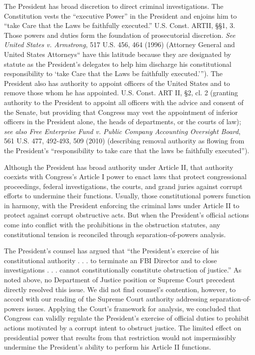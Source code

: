 The President has broad discretion to direct criminal investigations.
The Constitution vests the “executive Power” in the President and enjoins him to “take Care that the Laws be faithfully executed.” U.S. Const. ARTII, \S\S 1, 3.
Those powers and duties form the foundation of prosecutorial discretion.
\textit{See United States v. Armstrong}, 517 U.S. 456, 464 (1996) (Attorney General and United States Attorneys“ have this latitude because they are designated by statute as the President’s delegates to help him discharge his constitutional responsibility to ‘take Care that the Laws be faithfully executed.’”).
The President also has authority to appoint officers of the United States and to remove those whom he has appointed.
U.S. Const. ART II, \S 2, cl. 2 (granting authority to the President to appoint all officers with the advice and consent of the Senate, but providing that Congress may vest the appointment of inferior officers in the President alone, the heads of departments, or the courts of law);
\textit{see also Free Enterprise Fund v. Public Company Accounting Oversight Board}, 561 U.S. 477, 492-493, 509 (2010) (describing removal authority as flowing from the President’s “responsibility to take care that the laws be faithfully executed”).

Although the President has broad authority under Article II, that authority coexists with Congress’s Article I power to enact laws that protect congressional proceedings, federal investigations, the courts, and grand juries against corrupt efforts to undermine their functions.
Usually, those constitutional powers function in harmony, with the President enforcing the criminal laws under Article II to protect against corrupt obstructive acts.
But when the President’s official actions come into conflict with the prohibitions in the obstruction statutes, any constitutional tension is reconciled through separation-of-powers analysis.

The President’s counsel has argued that “the President’s exercise of his constitutional authority . . . to terminate an FBI Director and to close investigations . . . cannot constitutionally constitute obstruction of justice.”%
As noted above, no Department of Justice position or Supreme Court precedent directly resolved this issue.
We did not find counsel’s contention, however, to accord with our reading of the Supreme Court authority addressing separation-of-powers issues.
Applying the Court’s framework for analysis, we concluded that Congress can validly regulate the President’s exercise of official duties to prohibit actions motivated by a corrupt intent to obstruct justice.
The limited effect on presidential power that results from that restriction would not impermissibly undermine the President’s ability to perform his Article II functions.

